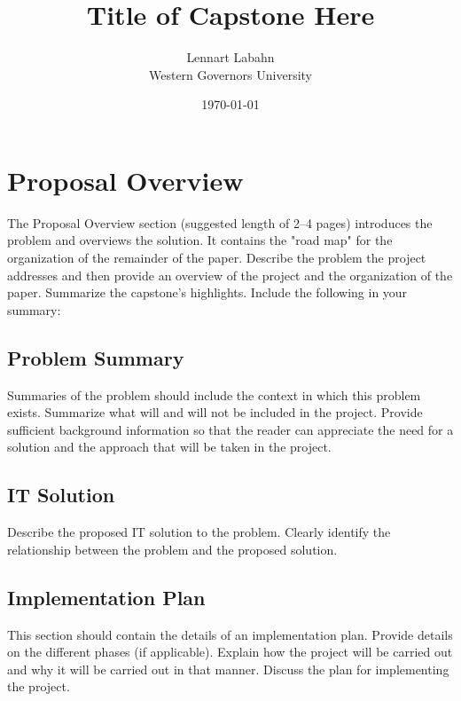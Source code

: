 \documentclass[12pt]{report}
\begin{document}
\title{Title of Capstone Here}
\author{Lennart Labahn \\ Western Governors University}
\date{\today}
\maketitle

\tableofcontents

\chapter*{Proposal Overview}

The Proposal Overview section (suggested length of 2–4 pages) introduces the problem and overviews the solution. It contains the "road map" for the organization of the remainder of the paper. Describe the problem the project addresses and then provide an overview of the project and the organization of the paper. Summarize the capstone’s highlights. Include the following in your summary:

\section*{Problem Summary}
Summaries of the problem should include the context in which this problem exists. Summarize what will and will not be included in the project. Provide sufficient background information so that the reader can appreciate the need for a solution and the approach that will be taken in the project.

\section*{IT Solution}
Describe the proposed IT solution to the problem. Clearly identify the relationship between the problem and the proposed solution.

\section*{Implementation Plan}
This section should contain the details of an implementation plan. Provide details on the different phases (if applicable). Explain how the project will be carried out and why it will be carried out in that manner. Discuss the plan for implementing the project.
\end{document}
